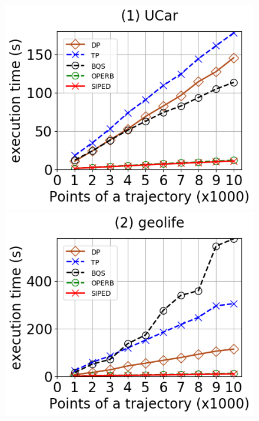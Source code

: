 \begin{figure}[tb!]
	\centering
	\includegraphics[scale=0.315]{Figures/Exp-PED-time-size-service.png}	\hspace{1ex}
	\includegraphics[scale=0.315]{Figures/Exp-PED-time-size-geolife.png}	\hspace{1ex}

\end{figure}
